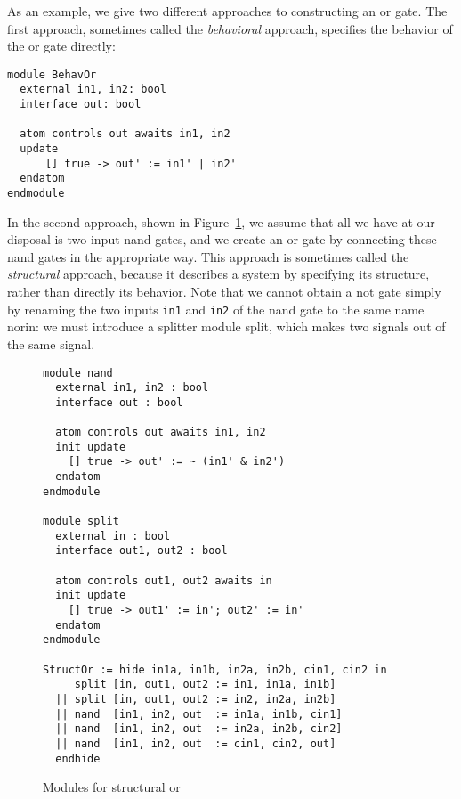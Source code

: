 {As an example, we give two different approaches to constructing an
{\sc or} gate.  The first approach, sometimes called the {\em
behavioral\/} approach, specifies the behavior of the {\sc or} gate
directly: 

\begin{verbatim}
module BehavOr
  external in1, in2: bool
  interface out: bool

  atom controls out awaits in1, in2
  update
      [] true -> out' := in1' | in2'
  endatom
endmodule
\end{verbatim}

\noindent
In the second approach, shown in Figure~\ref{fig-structuralor}, we
assume that all we have at our disposal is two-input {\sc nand} gates,
and we create an {\sc or} gate by connecting these {\sc nand} gates in
the appropriate way.  This approach is sometimes called the {\em
structural\/} approach, because it describes a system by specifying
its structure, rather than directly its behavior. Note that we cannot
obtain a {\sc not} gate simply by renaming the two inputs {\tt in1}
and {\tt in2} of the {\sc nand} gate to the same name {\sc norin}: we
must introduce a splitter module {\sc split}, which makes two signals
out of the same signal.

\begin{figure}
\begin{verbatim}
module nand 
  external in1, in2 : bool
  interface out : bool

  atom controls out awaits in1, in2
  init update
    [] true -> out' := ~ (in1' & in2')
  endatom
endmodule

module split
  external in : bool
  interface out1, out2 : bool

  atom controls out1, out2 awaits in 
  init update
    [] true -> out1' := in'; out2' := in' 
  endatom 
endmodule

StructOr := hide in1a, in1b, in2a, in2b, cin1, cin2 in 
     split [in, out1, out2 := in1, in1a, in1b]
  || split [in, out1, out2 := in2, in2a, in2b]
  || nand  [in1, in2, out  := in1a, in1b, cin1] 
  || nand  [in1, in2, out  := in2a, in2b, cin2] 
  || nand  [in1, in2, out  := cin1, cin2, out]
  endhide
\end{verbatim}
\caption{Modules for structural {\sc or}}
\label{fig-structuralor}
\end{figure}




}
